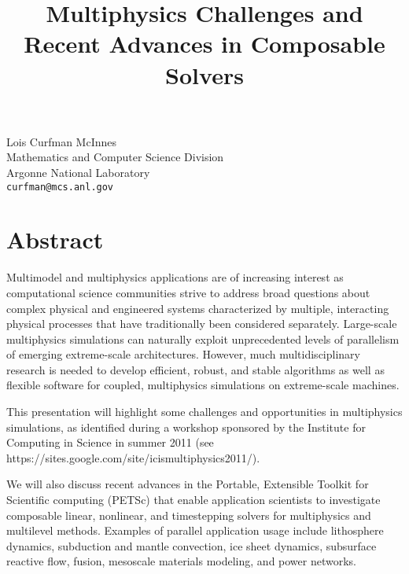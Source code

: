 \title{Multiphysics Challenges and Recent Advances in Composable Solvers}
\author{}  \institute{}
\maketitle
\begin{center}
{\large Lois Curfman McInnes}\\
Mathematics and Computer Science Division\\
Argonne National Laboratory\\
{\tt curfman@mcs.anl.gov}

\end{center}

\section*{Abstract}

Multimodel and multiphysics applications are of increasing interest as computational science communities strive to address broad questions about complex physical and engineered systems characterized by multiple, interacting physical processes that have traditionally been considered separately.  Large-scale multiphysics simulations can
naturally exploit unprecedented levels of parallelism of emerging extreme-scale architectures. However, much multidisciplinary research is needed to develop efficient, robust, and stable algorithms as well as flexible software for coupled, multiphysics simulations on extreme-scale machines.

This presentation will highlight some challenges and opportunities in multiphysics simulations, as identified during a workshop sponsored by the Institute for Computing in Science in summer 2011 (see https://sites.google.com/site/icismultiphysics2011/).

We will also discuss recent advances in the Portable, Extensible Toolkit for Scientific computing (PETSc) that enable application scientists to investigate composable linear, nonlinear, and timestepping solvers for multiphysics and multilevel methods.
Examples of parallel application usage include lithosphere dynamics, subduction and mantle convection, ice sheet dynamics, subsurface
reactive flow, fusion, mesoscale materials modeling, and power networks.


